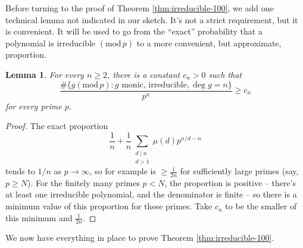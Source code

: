 \documentclass[12pt]{amsart}
\newtheorem{lemma}[theorem]{Lemma}
\theoremstyle{definition} \newtheorem*{notation}{Notation}
\theoremstyle{remark} \newtheorem*{remark}{Remark}
\theoremstyle{remark} \newtheorem*{example}{Example}
\theoremstyle{definition} \newtheorem*{definition}{Definition}
\numberwithin{equation}{section}
\numberwithin{theorem}{section}
\renewcommand{\pmod}[1]{\left(\mathrm{mod}\,#1\right)}
\begin{document}
	Before turning to the proof of Theorem \ref{thm:irreducible-100}, we add one technical lemma not indicated in our sketch.  It's not a strict requirement, but it is convenient.  It will be used to go from the ``exact'' probability that a polynomial is irreducible $\pmod{p}$ to a more convenient, but approximate, proportion.
	
	\begin{lemma}\label{lem:irred-prop-lower}
		For every $n \geq 2$, there is a constant $c_n>0$ such that
			\[
				\frac{\#\{ g \pmod{p} : g \text{ monic, irreducible}, \deg g = n\}}{p^n}
					\geq c_n
			\]
		for every prime $p$.
	\end{lemma}
	\begin{proof}
		The exact proportion
			\[
				\frac{1}{n} + \frac{1}{n}\sum_{\substack{d \mid n \\ d >1}} \mu(d) p^{n/d - n}
			\]
		tends to $1/n$ as $p \to \infty$, so for example is $\geq \frac{1}{2n}$ for sufficiently large primes (say, $p \geq N$).  For the finitely many primes $p < N$, the proportion is positive -- there's at least one irreducible polynomial, and the denominator is finite -- so there is a minimum value of this proportion for these primes.  Take $c_n$ to be the smaller of this minimum and $\frac{1}{2n}$.
	\end{proof}
	
	We now have everything in place to prove Theorem \ref{thm:irreducible-100}.
	
\end{document}
